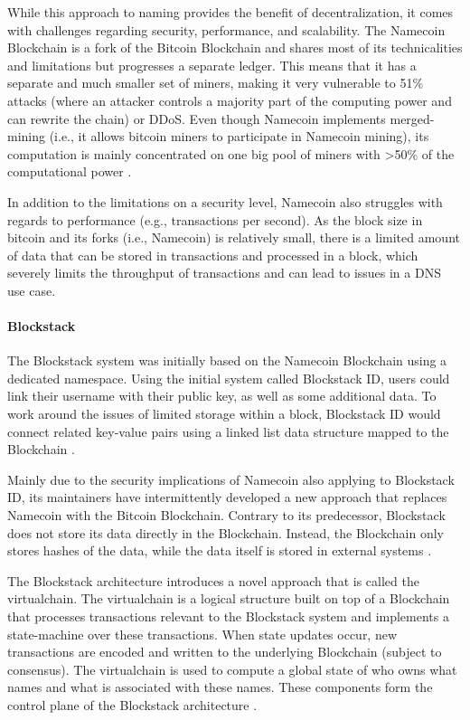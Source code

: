 While this approach to naming provides the benefit of decentralization, it comes with challenges regarding security, performance, and scalability. The Namecoin Blockchain is a fork of the Bitcoin Blockchain and shares most of its technicalities and limitations but progresses a separate ledger. This means that it has a separate and much smaller set of miners, making it very vulnerable to 51\% attacks (where an attacker controls a majority part of the computing power and can rewrite the chain) or DDoS. Even though Namecoin implements merged-mining (i.e., it allows bitcoin miners to participate in Namecoin mining), its computation is mainly concentrated on one big pool of miners with >50\% of the computational power \cite{noauthor_namecoin_nodate, ali_blockstack:_2016}.

In addition to the limitations on a security level, Namecoin also struggles with regards to performance (e.g., transactions per second). As the block size in bitcoin and its forks (i.e., Namecoin) is relatively small, there is a limited amount of data that can be stored in transactions and processed in a block, which severely limits the throughput of transactions and can lead to issues in a DNS use case.

\paragraph{Blockstack}

The Blockstack system was initially based on the Namecoin Blockchain using a dedicated namespace. Using the initial system called Blockstack ID, users could link their username with their public key, as well as some additional data. To work around the issues of limited storage within a block, Blockstack ID would connect related key-value pairs using a linked list data structure mapped to the Blockchain \cite{ali_blockstack:_2016}.

Mainly due to the security implications of Namecoin also applying to Blockstack ID, its maintainers have intermittently developed a new approach that replaces Namecoin with the Bitcoin Blockchain. Contrary to its predecessor, Blockstack does not store its data directly in the Blockchain. Instead, the Blockchain only stores hashes of the data, while the data itself is stored in external systems \cite{ali_blockstack:_2016}.

The Blockstack architecture introduces a novel approach that is called the virtualchain. The virtualchain is a logical structure built on top of a Blockchain that processes transactions relevant to the Blockstack system and implements a state-machine over these transactions. When state updates occur, new transactions are encoded and written to the underlying Blockchain (subject to consensus). The virtualchain is used to compute a global state of who owns what names and what is associated with these names. These components form the control plane of the Blockstack architecture \cite{ali_blockstack:_2016}.

